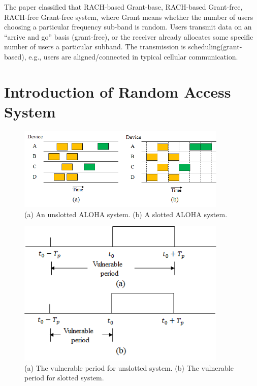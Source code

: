 The paper\cite{shahab2019grant} classified that RACH-based Grant-base, RACH-based Grant-free, RACH-free Grant-free system, where Grant means whether the number of users choosing a particular frequency sub-band is random. Users transmit data on an “arrive and go” basis (grant-free), or the receiver already allocates some specific number of users a particular subband. The transmission is scheduling(grant-based), e.g., users are aligned/connected in typical cellular communication.

\section{Introduction of Random Access System}

\begin{figure}[b!]
 \centering
 \includegraphics[width=10cm]{fig/RACH_slotted_unslotted.png}
 \caption{(a) An unslotted ALOHA system. (b) A slotted ALOHA system.}
 \label{fig:RACH_slotted_unslotted}
\end{figure}

\begin{figure}[t!]
 \centering
 \includegraphics[width=10cm]{fig/RACH_vulnerable.png}
 \caption{(a) The vulnerable period for unslotted system. (b) The vulnerable period for slotted system.}
 \label{fig:RACH_vulnerable}
\end{figure}

